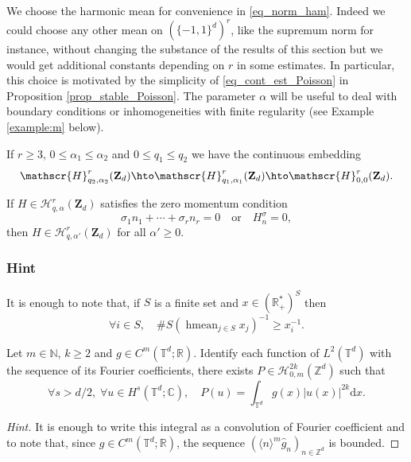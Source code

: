 We choose the harmonic mean for convenience in \eqref{eq_norm_ham}. Indeed we could choose any other mean on $(\{-1,1\}^d)^r$, like the supremum norm for instance, without changing the substance of the results of this section but we would get additional constants depending on $r$ in some estimates. In particular, this choice is motivated by the simplicity of \eqref{eq_cont_est_Poisson} in Proposition \ref{prop_stable_Poisson}. The parameter $\alpha$ will be useful to deal with boundary conditions or inhomogeneities with finite regularity (see Example \ref{example:m} below).

\begin{remark} If $r\geq 3$, $0\leq \alpha_1 \leq \alpha_2 $ and $0\leq q_1 \leq q_2 $ we have the continuous embedding\vspace*{-3pt}
\[
\mathscr{H}_{q_2,\alpha_2}^{r}(\mathbf{Z}_d) \hto \mathscr{H}_{q_1,\alpha_1}^{r}(\mathbf{Z}_d) \hto \mathscr{H}_{0,0}^{r}(\mathbf{Z}_d).
\]
\end{remark}

\begin{example} If $H\in \mathscr{H}_{q,\alpha}^{r}(\mathbf{Z}_d)$ satisfies the zero momentum condition
\[
\sigma_1 n_1+ \cdots+ \sigma_r n_r = 0 \quad \mathrm{or} \quad H_{n}^{\sigma}=0,
\]
then $H\in \mathscr{H}_{q,\alpha'}^{r}(\mathbf{Z}_d)$ for all $\alpha'\geq 0$.
\subsubsection*{Hint}
It is enough to note that, if $S$ is a finite set and $x\in (\mathbb{R}_+^*)^S$ then
\[
\forall i\in S, \quad \# S (\mathop{\mathrm{hmean}}_{j\in S} x_j)^{-1} \geq x_{i}^{-1}.
\]
\end{example}

\begin{example}\label{example:m} Let $m\in \mathbb{N}$, $k\geq 2$ and $g\in C^m(\mathbb{T}^d;\mathbb{R})$. Identify each function of $L^2(\mathbb{T}^d)$ with the sequence of its Fourier coefficients, there exists $P\in \mathscr{H}_{0,m}^{2k}(\mathbb{Z}^d)$ such that
\[
\forall s>d/2,\;\forall u\in H^s(\mathbb{T}^d;\mathbb{C}), \quad P(u) = \int_{\mathbb{T}^d} g(x) |u(x)|^{2k} \mathrm{d}x.
\]
\begin{proof}[Hint]
It is enough to write this integral as a convolution of Fourier coefficient and to note that, since $g\in C^m(\mathbb{T}^d;\mathbb{R})$, the sequence $(\langle n\rangle^m \widehat{g}_n)_{n\in \mathbb{Z}^d}$ is bounded.\skipqed
\end{proof}
\end{example}

